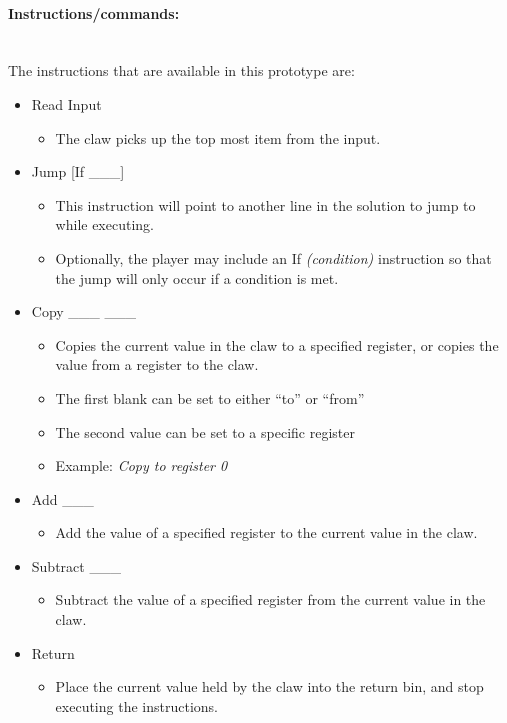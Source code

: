 \paragraph{Instructions/commands:} ~\\
The instructions that are available in this prototype are:
\begin{itemize}
	\item Read Input
	\begin{itemize}
		\item The claw picks up the top most item from the input.
	\end{itemize}
	\item Jump [If \_\_\_]
	\begin{itemize}
		\item This instruction will point to another line in the solution to jump to 
		while executing.
		\item Optionally, the player may include an If \textit{(condition)} instruction 
		so that the jump will only occur if a condition is met.
	\end{itemize}
	\item Copy \_\_\_ \_\_\_
	\begin{itemize}
		\item Copies the current value in the claw to a specified register, or copies 
		the value from a register to the claw.
		\item The first blank can be set to either ``to'' or ``from''
		\item The second value can be set to a specific register
		\item Example: \textit{Copy to register 0}
	\end{itemize}
	\item Add \_\_\_
	\begin{itemize}
		\item Add the value of a specified register to the current value in the claw.
	\end{itemize}
	\item Subtract \_\_\_
	\begin{itemize}
		\item Subtract the value of a specified register from the current value in the claw.
	\end{itemize}
	\item Return
	\begin{itemize}
		\item Place the current value held by the claw into the return bin, and stop 
		executing the instructions.
	\end{itemize}
\end{itemize}

